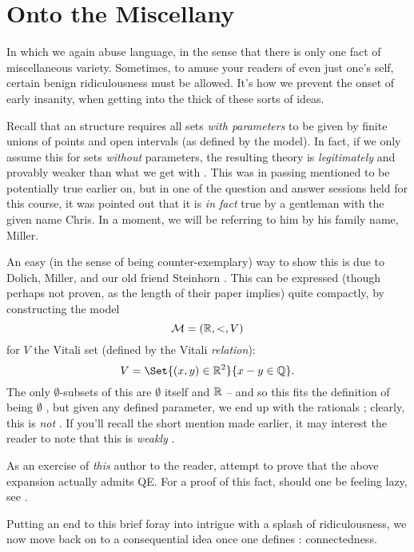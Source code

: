 \section{Onto the Miscellany}

In which we again abuse language, in the sense that there is only one fact of miscellaneous variety. Sometimes, to amuse your readers of even just one's self, certain benign ridiculousness must be allowed. It's how we prevent the onset of early insanity, when getting into the thick of these sorts of ideas.

\begin{remark}
  Recall that an \om structure requires all  sets \emph{with parameters} to be given by finite unions of points and open intervals (as defined by the model). In fact, if we only assume this for sets  \emph{without} parameters, the resulting theory is \emph{legitimately} and provably weaker than what we get with \omy. This was in passing mentioned to be potentially true earlier on, but in one of the question and answer sessions held for this course, it was pointed out that it is \emph{in fact} true by a gentleman with the given name Chris. In a moment, we will be referring to him by his family name, Miller.

  An easy (in the sense of being counter-exemplary) way to show this is due to Dolich, Miller, and our old friend Steinhorn \cite{dolich_structures_2009}. This can be expressed (though perhaps not proven, as the length of their paper implies) quite compactly, by constructing the model
  $$
    \mathcal{M} = (\mathbb{R}, <, V)
  $$
  for $V$ the Vitali set (defined by the Vitali \emph{relation}):
  $$
    V = \Set{(x, y) \in \R^2}{x - y \in \Q}.
  $$
  The only $\emptyset$- subsets of this are $\emptyset$ itself and $\mathbb{R}$ -- and so this fits the definition of being $\emptyset$ \om, but given any defined parameter, we end up with the rationals ; clearly, this is \emph{not} \om. If you'll recall the short mention made earlier, it may interest the reader to note that this is \emph{weakly} \om.

  \begin{exercise}
    As an exercise of \emph{this} author to the reader, attempt to prove that the above expansion actually admits QE. For a proof of this fact, should one be feeling lazy, see \cite{dolich_structures_2009}.
  \end{exercise}
\end{remark}

Putting an end to this brief foray into intrigue with a splash of ridiculousness, we now move back on to a consequential idea once one defines \cds: connectedness.

